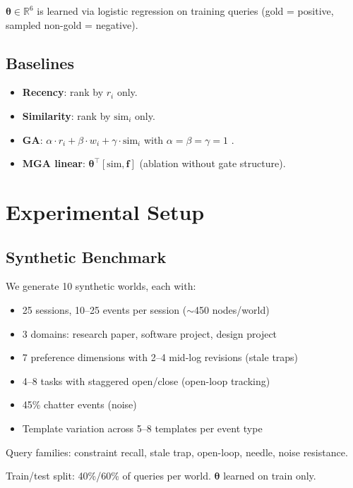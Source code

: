 \documentclass[11pt,a4paper]{article}
\begin{document}
$\boldsymbol{\theta} \in \mathbb{R}^6$ is learned via logistic regression on training queries (gold = positive, sampled non-gold = negative).

\subsection{Baselines}

\begin{itemize}[leftmargin=2em]
\item \textbf{Recency}: rank by $r_i$ only.
\item \textbf{Similarity}: rank by $\text{sim}_i$ only.
\item \textbf{GA}: $\alpha \cdot r_i + \beta \cdot w_i + \gamma \cdot \text{sim}_i$ with $\alpha = \beta = \gamma = 1$ \citep{park2023generative}.
\item \textbf{MGA linear}: $\boldsymbol{\theta}^\top [\text{sim}, \mathbf{f}]$ (ablation without gate structure).
\end{itemize}

\section{Experimental Setup}

\subsection{Synthetic Benchmark}

We generate 10 synthetic worlds, each with:
\begin{itemize}[leftmargin=2em]
\item 25 sessions, 10--25 events per session ($\sim$450 nodes/world)
\item 3 domains: research paper, software project, design project
\item 7 preference dimensions with 2--4 mid-log revisions (stale traps)
\item 4--8 tasks with staggered open/close (open-loop tracking)
\item 45\% chatter events (noise)
\item Template variation across 5--8 templates per event type
\end{itemize}

Query families: constraint recall, stale trap, open-loop, needle, noise resistance.

Train/test split: 40\%/60\% of queries per world. $\boldsymbol{\theta}$ learned on train only.
\end{document}
